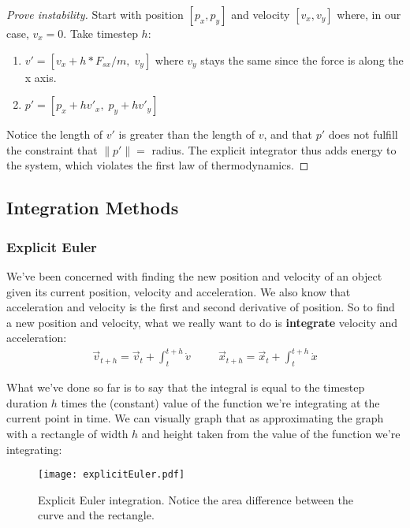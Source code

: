 \documentclass[]{article}
\begin{document}
\begin{proof}[Prove instability]
Start with position $[p_x, p_y]$ and velocity $[v_x, v_y]$ where, in our case, $v_x = 0$. Take timestep $h$:
\begin{enumerate}
	\item $v' = [v_x + h*F_{sx}/m,\; v_y]$ where $v_y$ stays the same since the force is along the x axis.
	\item $p' = [p_x + hv'_x,\; p_y + hv'_y]$
\end{enumerate}
Notice the length of $v'$ is greater than the length of $v$, and that $p'$ does not fulfill the constraint that $\parallel p'\parallel = $ radius. The explicit integrator thus adds energy to the system, which violates the first law of thermodynamics.
\end{proof}

\subsection{Integration Methods}

\subsubsection{Explicit Euler}

We've been concerned with finding the new position and velocity of an object given its current position, velocity and acceleration. We also know that acceleration and velocity is the first and second derivative of position. So to find a new position and velocity, what we really want to do is \textbf{integrate} velocity and acceleration:
\begin{eqnarray}
	\vec{v}_{t+h} = \vec{v}_t + \int_t^{t+h}\dot{v} \;\;\;\;\;\;\;\;\; 	\vec{x}_{t+h} = \vec{x}_t + \int_t^{t+h}\dot{x}
\end{eqnarray}

What we've done so far is to say that the integral is equal to the timestep duration $h$ times the (constant) value of the function we're integrating at the current point in time. We can visually graph that as approximating the graph with a rectangle of width $h$ and height taken from the value of the function we're integrating:

\begin{figure}[htp]
    \centering
    \texttt{[image: explicitEuler.pdf]}
    \caption{Explicit Euler integration. Notice the area difference between the curve and the rectangle.}
	\label{EulerOvershootGraph}
\end{figure}
\end{document}
